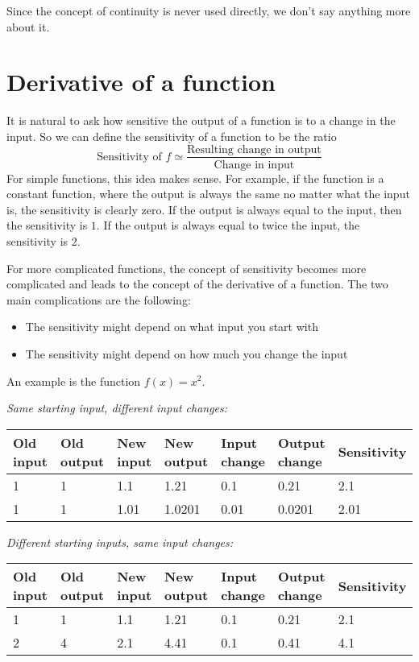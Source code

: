 \documentclass{math-deane}
\begin{document}
Since the concept of continuity is never used directly, we don't say anything more about it.

\section{Derivative of a function}

It is natural to ask how sensitive the output of a function is to a change in the input. So we can define the sensitivity of a function to be the ratio
\[
\text{Sensitivity of }f \simeq \frac{\text{Resulting change in output}}{\text{Change in input}}
\]
For simple functions, this idea makes sense. For example, if the function is a constant function, where the output is always the same no matter what the input is, the sensitivity is clearly zero. If the output is always equal to the input, then the sensitivity is $1$. If the output is always equal to twice the input, the sensitivity is $2$.

For more complicated functions, the concept of sensitivity becomes more complicated and leads to the concept of the derivative of a function. The two main complications are the following:
\begin{itemize}
\item The sensitivity might depend on what input you start with
\item The sensitivity might depend on how much you change the input
\end{itemize}

An example is the function $f(x) = x^2$. 

{\em Same starting input, different input changes:}\\
\begin{tabular}{|p{0.5in}|p{0.5in}|p{0.5in}|p{0.5in}|p{0.5in}|p{0.5in}|p{0.75in}|}
\hline
Old input&Old output&New input& New output & Input change &
Output change & Sensitivity \\ \hline\hline
1 & 1 & 1.1 & 1.21 & 0.1 & 0.21 & 2.1\\ \hline
1 & 1 & 1.01 & 1.0201 & 0.01 & 0.0201 & 2.01\\ \hline
\end{tabular}

{\em Different starting inputs, same input changes:}\\
\begin{tabular}{|p{0.5in}|p{0.5in}|p{0.5in}|p{0.5in}|p{0.5in}|p{1in}|p{1in}|}
\hline
Old input&Old output&New input& New output & Input change &
Output change & Sensitivity \\ \hline \hline
1 & 1 & 1.1 & 1.21 & 0.1 & 0.21 & 2.1\\ \hline
2 & 4 & 2.1 & 4.41 & 0.1 & 0.41 & 4.1 \\ \hline
\end{tabular}
\end{document}
